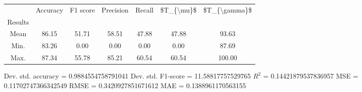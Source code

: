 \begin{tabular}{|c|c|c|c|c|c|c|}
\toprule
{} &  Accuracy &  F1 score &  Precision &  Recall &  \$T\_\{\textbackslash mu\}\$ &  \$T\_\{\textbackslash gamma\}\$ \\
Results &           &           &            &         &            &               \\
\hline
Mean    &     86.15 &     51.71 &      58.51 &   47.88 &      47.88 &         93.63 \\
Min.    &     83.26 &      0.00 &       0.00 &    0.00 &       0.00 &         87.69 \\
Max.    &     87.34 &     55.78 &      85.21 &   60.54 &      60.54 &        100.00 \\
\bottomrule
\end{tabular}

 Dev. std. accuracy = 0.9884554758791041
 Dev. std. F1-score = 11.58817757529765
 $R^2$ = 0.14421879537836957
 MSE = 0.11702747366342549
 RMSE = 0.3420927851671612
 MAE = 0.1388961170563155